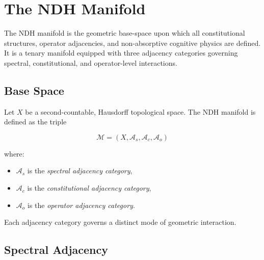 
\section{The NDH Manifold}
\label{sec:ndh-manifold}

The NDH manifold is the geometric base-space upon which all constitutional
structures, operator adjacencies, and non-absorptive cognitive physics are
defined. It is a tenary manifold equipped with three adjacency categories
governing spectral, constitutional, and operator-level interactions.


\subsection{Base Space}

Let $X$ be a second-countable, Hausdorff topological space. The NDH manifold
is defined as the triple

\[
\mathcal{M} = (X, \mathcal{A}_s, \mathcal{A}_c, \mathcal{A}_o)
\]

where:

\begin{itemize}
    \item $\mathcal{A}_s$ is the \emph{spectral adjacency category},
    \item $\mathcal{A}_c$ is the \emph{constitutional adjacency category},
    \item $\mathcal{A}_o$ is the \emph{operator adjacency category}.
\end{itemize}

Each adjacency category governs a distinct mode of geometric interaction.


\subsection{Spectral Adjacency}

